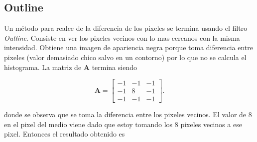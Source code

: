 \subsection{Outline}

Un método para realce de la diferencia de los pixeles se termina usando el filtro \textit{Outline}. Consiste en ver los pixeles vecinos con lo mas cercanos con la misma intensidad. Obtiene una imagen de apariencia negra porque toma diferencia entre pixeles (valor demasiado chico salvo en un contorno) por lo que no se calcula el histograma. La matriz de \textbf{A} termina siendo

\begin{equation}
\textbf{A}=\begin{bmatrix}
-1 &-1 &-1\\
-1 &8 &-1\\
-1 &-1 &-1
\end{bmatrix}.
\end{equation}

donde se observa que se toma la diferencia entre los pixeles vecinos. El valor de 8 en el pixel del medio viene dado que estoy tomando los 8 pixeles vecinos a ese pixel. Entonces el resultado obtenido es

